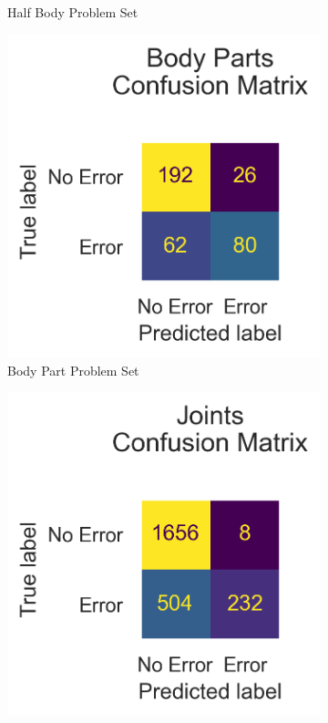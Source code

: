 \begin{figure}[ht]
\begin{subfigure}[b]{0.47\linewidth}
      \caption[]{Half Body Problem Set}
      \label{fig:hb_conf_v1}
  \end{subfigure}
  \hfill
  \begin{subfigure}[b]{0.47\linewidth}
      \centering
      \includegraphics[width=\textwidth]{figures/Results/v1/confusion/body_parts_together.png}
      \caption[]{Body Part Problem Set}
      \label{fig:bp_conf_v1}
  \end{subfigure}
  \hfill
  \begin{subfigure}[b]{0.47\linewidth}
      \centering
      \includegraphics[width=\textwidth]{figures/Results/v1/confusion/joints_together.png}

\end{subfigure}
\end{figure}
